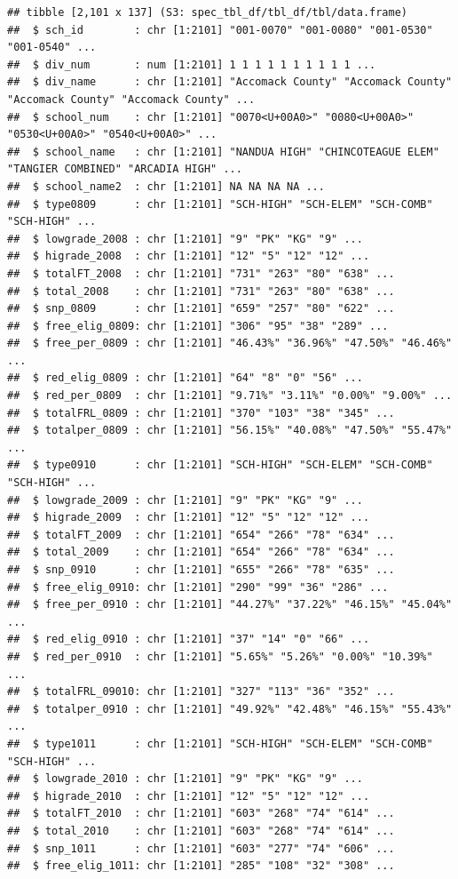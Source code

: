 \documentclass[
]{book}
\begin{document}
\begin{verbatim}
## tibble [2,101 x 137] (S3: spec_tbl_df/tbl_df/tbl/data.frame)
##  $ sch_id        : chr [1:2101] "001-0070" "001-0080" "001-0530" "001-0540" ...
##  $ div_num       : num [1:2101] 1 1 1 1 1 1 1 1 1 1 ...
##  $ div_name      : chr [1:2101] "Accomack County" "Accomack County" "Accomack County" "Accomack County" ...
##  $ school_num    : chr [1:2101] "0070<U+00A0>" "0080<U+00A0>" "0530<U+00A0>" "0540<U+00A0>" ...
##  $ school_name   : chr [1:2101] "NANDUA HIGH" "CHINCOTEAGUE ELEM" "TANGIER COMBINED" "ARCADIA HIGH" ...
##  $ school_name2  : chr [1:2101] NA NA NA NA ...
##  $ type0809      : chr [1:2101] "SCH-HIGH" "SCH-ELEM" "SCH-COMB" "SCH-HIGH" ...
##  $ lowgrade_2008 : chr [1:2101] "9" "PK" "KG" "9" ...
##  $ higrade_2008  : chr [1:2101] "12" "5" "12" "12" ...
##  $ totalFT_2008  : chr [1:2101] "731" "263" "80" "638" ...
##  $ total_2008    : chr [1:2101] "731" "263" "80" "638" ...
##  $ snp_0809      : chr [1:2101] "659" "257" "80" "622" ...
##  $ free_elig_0809: chr [1:2101] "306" "95" "38" "289" ...
##  $ free_per_0809 : chr [1:2101] "46.43%" "36.96%" "47.50%" "46.46%" ...
##  $ red_elig_0809 : chr [1:2101] "64" "8" "0" "56" ...
##  $ red_per_0809  : chr [1:2101] "9.71%" "3.11%" "0.00%" "9.00%" ...
##  $ totalFRL_0809 : chr [1:2101] "370" "103" "38" "345" ...
##  $ totalper_0809 : chr [1:2101] "56.15%" "40.08%" "47.50%" "55.47%" ...
##  $ type0910      : chr [1:2101] "SCH-HIGH" "SCH-ELEM" "SCH-COMB" "SCH-HIGH" ...
##  $ lowgrade_2009 : chr [1:2101] "9" "PK" "KG" "9" ...
##  $ higrade_2009  : chr [1:2101] "12" "5" "12" "12" ...
##  $ totalFT_2009  : chr [1:2101] "654" "266" "78" "634" ...
##  $ total_2009    : chr [1:2101] "654" "266" "78" "634" ...
##  $ snp_0910      : chr [1:2101] "655" "266" "78" "635" ...
##  $ free_elig_0910: chr [1:2101] "290" "99" "36" "286" ...
##  $ free_per_0910 : chr [1:2101] "44.27%" "37.22%" "46.15%" "45.04%" ...
##  $ red_elig_0910 : chr [1:2101] "37" "14" "0" "66" ...
##  $ red_per_0910  : chr [1:2101] "5.65%" "5.26%" "0.00%" "10.39%" ...
##  $ totalFRL_09010: chr [1:2101] "327" "113" "36" "352" ...
##  $ totalper_0910 : chr [1:2101] "49.92%" "42.48%" "46.15%" "55.43%" ...
##  $ type1011      : chr [1:2101] "SCH-HIGH" "SCH-ELEM" "SCH-COMB" "SCH-HIGH" ...
##  $ lowgrade_2010 : chr [1:2101] "9" "PK" "KG" "9" ...
##  $ higrade_2010  : chr [1:2101] "12" "5" "12" "12" ...
##  $ totalFT_2010  : chr [1:2101] "603" "268" "74" "614" ...
##  $ total_2010    : chr [1:2101] "603" "268" "74" "614" ...
##  $ snp_1011      : chr [1:2101] "603" "277" "74" "606" ...
##  $ free_elig_1011: chr [1:2101] "285" "108" "32" "308" ...

\end{verbatim}
\end{document}
